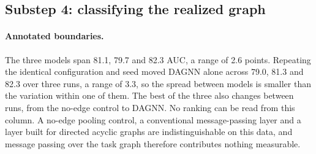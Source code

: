 \documentclass[10pt,twocolumn,letterpaper]{article}
\begin{document}
\subsection{Substep 4: classifying the realized graph}
\label{sec:sub4}

\begin{table}[t]
\centering
{}
\caption{Graph classification, pooled nested LORO over 384 recordings. The hand
rule uses no features, no training and no graph edges. Under annotated boundaries
the three models span 2.6 AUC, less than DAGNN moves on its own between runs
(\S\ref{sec:noise}), so that column contains no ranking. Under predicted
boundaries the no-edge control leads by 3.6, and led in all three runs we
recorded.}
\label{tab:sub4}
\end{table}

\paragraph{Annotated boundaries.} The three models span 81.1, 79.7 and 82.3 AUC,
a range of 2.6 points. Repeating the identical configuration and seed moved DAGNN
alone across 79.0, 81.3 and 82.3 over three runs, a range of 3.3, so the spread
between models is smaller than the variation within one of them. The best of the
three also changes between runs, from the no-edge control to DAGNN. No ranking can
be read from this column. A
no-edge pooling control, a conventional message-passing layer and a layer built
for directed acyclic graphs are indistinguishable on this data, and message
passing over the task graph therefore contributes nothing measurable.
\end{document}
